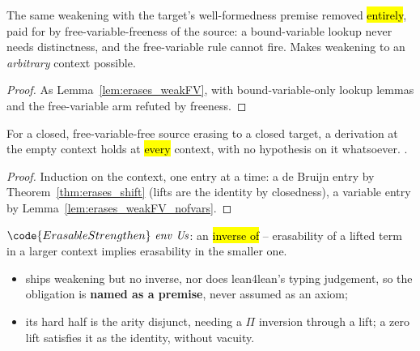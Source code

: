 \begin{lemma}
\label{lem:erases_weakFV_nofvars}
\leanok
{}
 The same weakening with the target's well-formedness premise removed \hl{entirely}, paid for by free-variable-freeness of the source: a bound-variable lookup never needs distinctness, and the free-variable rule cannot fire. Makes weakening to an \emph{arbitrary} context possible.
\end{lemma}
\begin{proof}
\leanok
{}
 As Lemma~\ref{lem:erases_weakFV}, with bound-variable-only lookup lemmas and the free-variable arm refuted by freeness.
\end{proof}

\begin{theorem}
\label{thm:erases_weak_any}
\leanok
{}
 For a closed, free-variable-free source erasing to a closed target, a derivation at the empty context holds at \hl{every} context, with no hypothesis on it whatsoever.
 \stProved{}.
\end{theorem}
\begin{proof}
\leanok
{}
 Induction on the context, one entry at a time: a de Bruijn entry by
Theorem~\ref{thm:erases_shift} (lifts are the identity by closedness), a variable entry by
Lemma~\ref{lem:erases_weakFV_nofvars}.
\end{proof}

\begin{definition}
\label{def:ErasableStrengthen}
\leanok
{}
 $\code{ErasableStrengthen}\ \mathit{env}\ \mathit{Us}$: an \hl{inverse of } -- erasability of a lifted term in a larger context implies erasability in the smaller one.
\begin{itemize}
\item {} ships weakening but no inverse, nor does lean4lean's typing judgement, so the obligation is \textbf{named as a premise}, never assumed as an axiom;
\item its hard half is the arity disjunct, needing a $\Pi$ inversion through a lift; a zero lift satisfies it as the identity, without vacuity.
\end{itemize}
\end{definition}

